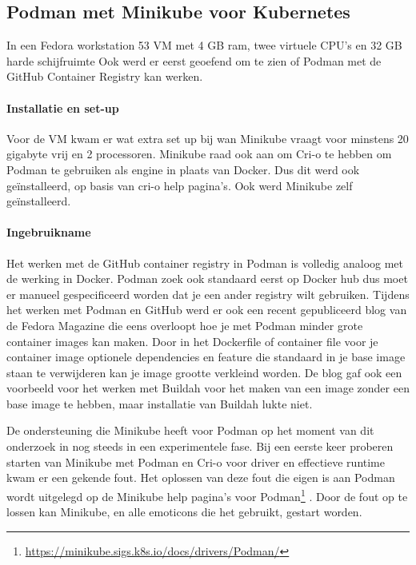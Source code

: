 \subsection{Podman met Minikube voor Kubernetes}
In een Fedora workstation 53 VM met 4 GB ram, twee virtuele CPU’s en 32 GB harde schijfruimte Ook werd er eerst geoefend om te zien of Podman met de GitHub Container Registry kan werken.
\paragraph{Installatie en set-up}
Voor de VM kwam er wat extra set up bij wan Minikube vraagt voor minstens 20 gigabyte vrij en 2 processoren.
Minikube raad ook aan om Cri-o te hebben om Podman te gebruiken als engine in plaats van Docker. Dus dit werd ook geïnstalleerd, op basis van cri-o help pagina’s.  Ook werd Minikube zelf geïnstalleerd.

\paragraph{Ingebruikname}
Het werken met de GitHub container registry in Podman is volledig analoog met de werking in Docker. Podman zoek ook standaard eerst op Docker hub dus moet er manueel gespecificeerd worden dat je een ander registry wilt gebruiken. Tijdens het werken met Podman en GitHub werd er ook een recent gepubliceerd blog van de Fedora Magazine die eens overloopt hoe je met Podman minder grote container images kan maken. Door in het Dockerfile of container file voor je container image optionele dependencies en feature die standaard in je base image staan te verwijderen kan je image grootte verkleind worden. De blog gaf ook een voorbeeld voor het werken met Buildah voor het maken van een image zonder een base image te hebben, maar installatie van Buildah lukte niet.

De ondersteuning die Minikube heeft voor Podman op het moment van dit onderzoek in nog steeds in een experimentele fase. Bij een eerste keer proberen starten van Minikube met Podman en Cri-o voor driver en effectieve runtime kwam er een gekende fout. Het oplossen van deze fout die eigen is aan Podman wordt uitgelegd op de Minikube help pagina’s voor Podman\footnote{\url{https://minikube.sigs.k8s.io/docs/drivers/Podman/}} . Door de fout op te lossen kan Minikube, en alle emoticons die het gebruikt, gestart worden.

